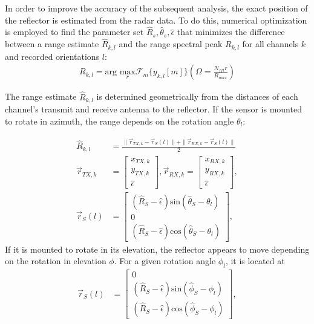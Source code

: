 In order to improve the accuracy of the subsequent analysis, the exact position of the reflector is estimated from the radar data.
To do this, numerical optimization is employed to find the parameter set 
$\hat R_s, \hat \theta_s, \hat \epsilon$ that minimizes the difference between
a range estimate $\hat R_{k,l}$ and the range spectral peak $R_{k,l}$ for all channels $k$ and recorded orientations $l$:
\begin{align}
    R_{k,l} = \text{arg } \underset{r}{\text{max}}\mathcal{F}_m\{y_{k,l}[m]\}\left(\Omega = \frac{N_{fft}r}{R_{max}}\right)
\end{align}

The range estimate $\hat R_{k,l}$ is determined geometrically from the distances of each channel's
transmit and receive antenna to the reflector. If the sensor is mounted to rotate in azimuth,
the range depends on the rotation angle $\theta_l $:

\begin{align}
    \hat R_{k,l}   & = \frac{\| \vec r_{TX,k} - \vec r_S(l) \|+\| \vec r_{RX,k} - \vec r_S(l) \|}{2}
    \\
    \vec{r}_{TX,k} & = \begin{bmatrix}
                           x_{TX,k} \\ y_{TX,k} \\ \hat \epsilon
                       \end{bmatrix},
    \vec r_{RX,k}       = \begin{bmatrix}
                              x_{RX,k} \\ y_{RX,k} \\ \hat \epsilon
                          \end{bmatrix},                                                                                        \\
    \vec r_S(l)    & = \begin{bmatrix}
                           (\hat R_S-\hat \epsilon) \text{sin}(\hat \theta_S-\theta_l) \\ 0 \\ (\hat R_S-\hat \epsilon) \text{cos}(\hat \theta_S-\theta_l)
                       \end{bmatrix},
\end{align}
If it is mounted to rotate in its elevation, the reflector appears to move depending on the rotation in elevation $\phi$.
For a given rotation angle $\phi_l$, it is located at
\begin{align}
    \vec r_S(l) & = \begin{bmatrix}
                        0 \\ (\hat R_S-\hat \epsilon) \text{sin}(\hat \phi_S-\phi_l) \\ (\hat R_S-\hat \epsilon) \text{cos}(\hat \phi_S-\phi_l)
                    \end{bmatrix},
\end{align}

